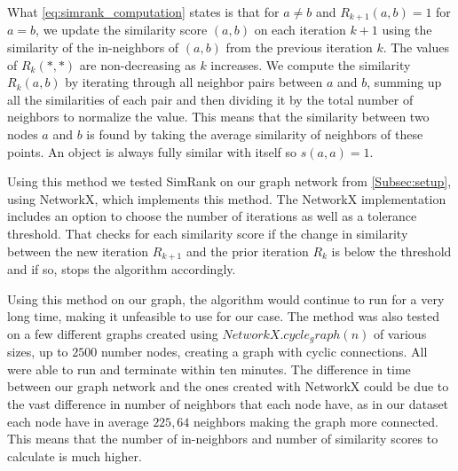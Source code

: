 What \autoref{eq:simrank_computation} states is that for $a \neq b$ and $R_{k+1}(a,b) = 1$ for $a = b$, we update the similarity score $(a,b)$ on each iteration $k+1$ using the similarity of the in-neighbors of $(a,b)$ from the previous iteration $k$. The values of $R_k(*,*)$ are non-decreasing as $k$ increases.
We compute the similarity $R_k(a,b)$ by iterating through all neighbor pairs between $a$ and $b$, summing up all the similarities of each pair and then dividing it by the total number of neighbors to normalize the value.
This means that the similarity between two nodes $a$ and $b$ is found by taking the average similarity of neighbors of these points. An object is always fully similar with itself so $s(a,a) = 1$.

Using this method we tested SimRank on our graph network from \autoref{Subsec:setup}, using NetworkX, which implements this method. The NetworkX implementation includes an option to choose the number of iterations as well as a tolerance threshold. That checks for each similarity score if the change in similarity between the new iteration $R_{k+1}$ and the prior iteration $R_k$ is below the threshold and if so, stops the algorithm accordingly.

Using this method on our graph, the algorithm would continue to run for a very long time, making it unfeasible to use for our case. The method was also tested on a few different graphs created using $NetworkX.cycle_graph(n)$ of various sizes, up to $2500$ number nodes, creating a graph with cyclic connections. All were able to run and terminate within ten minutes. The difference in time between our graph network and the ones created with NetworkX could be due to the vast difference in number of neighbors that each node have, as in our dataset each node have in average $225,64$ neighbors making the graph more connected. This means that the number of in-neighbors and number of similarity scores to calculate is much higher.